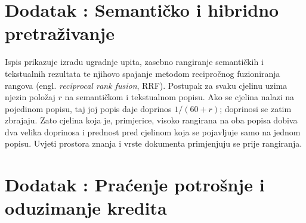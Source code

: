 



\section*{Dodatak : Semantičko i hibridno pretraživanje}
\label{app:hibridno-pretrazivanje}

Ispis prikazuje izradu ugradnje upita, zasebno rangiranje semantičkih i tekstualnih rezultata te njihovo spajanje metodom recipročnog fuzioniranja rangova (engl. \textit{reciprocal rank fusion}, RRF). Postupak za svaku cjelinu uzima njezin položaj \(r\) na semantičkom i tekstualnom popisu. Ako se cjelina nalazi na pojedinom popisu, taj joj popis daje doprinos \(1/(60+r)\); doprinosi se zatim zbrajaju. Zato cjelina koja je, primjerice, visoko rangirana na oba popisa dobiva dva velika doprinosa i prednost pred cjelinom koja se pojavljuje samo na jednom popisu. Uvjeti prostora znanja i vrste dokumenta primjenjuju se prije rangiranja.



\section*{Dodatak : Praćenje potrošnje i oduzimanje kredita}
\label{app:pracenje-potrosnje}

